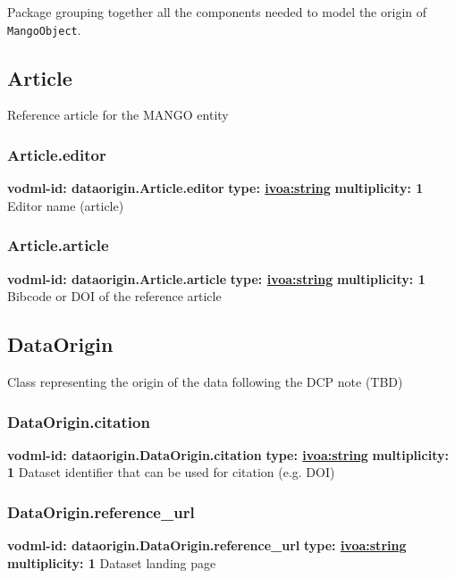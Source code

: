   Package grouping together all the components needed to model the origin of \texttt{MangoObject}.

  \subsection{Article}
  \label{sect:dataorigin.Article}
    Reference article for the MANGO entity

    \subsubsection{Article.editor}
      \textbf{vodml-id: dataorigin.Article.editor} \newline
      \textbf{type: \hyperref[sect:ivoa]{ivoa:string}} \newline
      \textbf{multiplicity: 1} \newline 
      Editor name (article)

    \subsubsection{Article.article}
      \textbf{vodml-id: dataorigin.Article.article} \newline
      \textbf{type: \hyperref[sect:ivoa]{ivoa:string}} \newline
      \textbf{multiplicity: 1} \newline 
      Bibcode or DOI of the reference article

  \subsection{DataOrigin}
  \label{sect:dataorigin.DataOrigin}
    Class representing the origin of the data following the DCP note (TBD)

    \subsubsection{DataOrigin.citation}
      \textbf{vodml-id: dataorigin.DataOrigin.citation} \newline
      \textbf{type: \hyperref[sect:ivoa]{ivoa:string}} \newline
      \textbf{multiplicity: 1} \newline 
      Dataset identifier that can be used for citation (e.g. DOI)

    \subsubsection{DataOrigin.reference\_url}
      \textbf{vodml-id: dataorigin.DataOrigin.reference\_url} \newline
      \textbf{type: \hyperref[sect:ivoa]{ivoa:string}} \newline
      \textbf{multiplicity: 1} \newline 
      Dataset landing page

